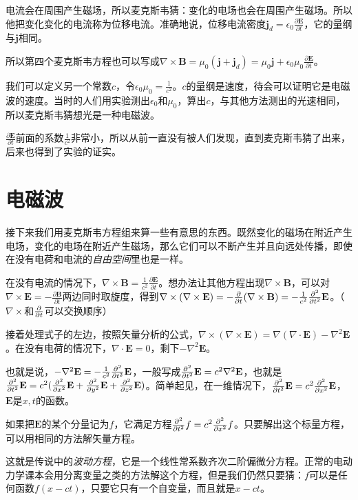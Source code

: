 电流会在周围产生磁场，所以麦克斯韦猜：变化的电场也会在周围产生磁场。所以他把变化变化的电流称为位移电流。准确地说，位移电流密度$\mathbf{j}_d=\epsilon_0 \frac{\partial \mathbf{E}}{\partial t}$，它的量纲与$\mathbf{j}$相同。

所以第四个麦克斯韦方程也可以写成$\nabla \times \mathbf{B}=\mu_0 (\mathbf{j}+\mathbf{j}_d)=\mu_0 \mathbf{j}+\epsilon_0 \mu_0 \frac{\partial \mathbf{E}}{\partial t}$。

我们可以定义另一个常数$c$，令$\epsilon_0 \mu_0=\frac{1}{c^2}$。$c$的量纲是速度，待会可以证明它是电磁波的速度。当时的人们用实验测出$\epsilon_0$和$\mu_0$，算出$c$，与其他方法测出的光速相同，所以麦克斯韦猜想光是一种电磁波。

$\frac{\partial \mathbf{E}}{\partial t}$前面的系数$\frac{1}{c^2}$非常小，所以从前一直没有被人们发现，直到麦克斯韦猜了出来，后来也得到了实验的证实。
\section{电磁波}
接下来我们用麦克斯韦方程组来算一些有意思的东西。既然变化的磁场在附近产生电场，变化的电场在附近产生磁场，那么它们可以不断产生并且向远处传播，即使在没有电荷和电流的\emph{自由空间}里也是一样。

在没有电流的情况下，$\nabla \times \mathbf{B}=\frac{1}{c^2} \frac{\partial \mathbf{E}}{\partial t}$。想办法让其他方程出现$\nabla \times \mathbf{B}$，可以对$\nabla \times \mathbf{E}=-\frac{\partial \mathbf{B}}{\partial t}$两边同时取旋度，得到$\nabla \times (\nabla \times \mathbf{E})=-\frac{\partial}{\partial t}(\nabla \times \mathbf{B})=-\frac{1}{c^2} \frac{\partial^{2}}{\partial t^{2}} \mathbf{E}$。（$\nabla \times$和$\frac{\partial}{\partial t}$可以交换顺序）

接着处理式子的左边，按照矢量分析的公式，$\nabla \times (\nabla \times \mathbf{E})=\nabla(\nabla \cdot \mathbf{E})-\nabla^2 \mathbf{E}$。在没有电荷的情况下，$\nabla \cdot \mathbf{E}=0$，剩下$-\nabla^2 \mathbf{E}$。

也就是说，$-\nabla^2 \mathbf{E}=-\frac{1}{c^2} \frac{\partial^{2}}{\partial t^{2}} \mathbf{E}$，一般写成$\frac{\partial^{2}}{\partial t^{2}} \mathbf{E}=c^2 \nabla^2 \mathbf{E}$，也就是$\frac{\partial^{2}}{\partial t^{2}} \mathbf{E}=c^2 (\frac{\partial^{2}}{\partial x^{2}} \mathbf{E}+\frac{\partial^{2}}{\partial y^{2}} \mathbf{E}+\frac{\partial^{2}}{\partial z^{2}} \mathbf{E})$。简单起见，在一维情况下，$\frac{\partial^{2}}{\partial t^{2}} \mathbf{E}=c^2 \frac{\partial^{2}}{\partial x^{2}} \mathbf{E}$，$\mathbf{E}$是$x,t$的函数。

如果把$\mathbf{E}$的某个分量记为$f$，它满足方程$\frac{\partial^{2}}{\partial t^{2}} f=c^2 \frac{\partial^{2}}{\partial x^{2}} f$。只要解出这个标量方程，可以用相同的方法解矢量方程。

这就是传说中的\emph{波动方程}，它是一个线性常系数齐次二阶偏微分方程。正常的电动力学课本会用分离变量之类的方法解这个方程，但是我们仍然只要猜：$f$可以是任何函数$f(x-c t)$，只要它只有一个自变量，而且就是$x-c t$。

